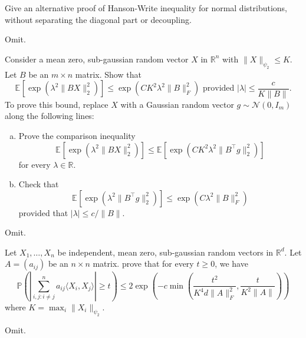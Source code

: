 \begin{problem*}[Exercise 6.2.5]\label{ex6.2.5}
	Give an alternative proof of Hanson-Write inequality for normal distributions, without separating the diagonal part or decoupling.
\end{problem*}
\begin{answer}
	Omit.
\end{answer}

\begin{problem*}[Exercise 6.2.6]\label{ex6.2.6}
	Consider a mean zero, sub-gaussian random vector \(X\) in \(\mathbb{R} ^n\) with \(\lVert X \rVert _{\psi _2} \leq K\). Let \(B\) be an \(m \times n\) matrix. Show that
	\[
		\mathbb{E}_{}\left[\exp (\lambda ^2 \lVert BX \rVert _2^2)\right]
		\leq \exp (CK^2 \lambda ^2 \lVert B \rVert _F^2)
		\text{ provided } \lvert \lambda \rvert \leq \frac{c}{K \lVert B \rVert }.
	\]
	To prove this bound, replace \(X\) with a Gaussian random vector \(g \sim \mathcal{N} (0, I_m)\) along the following lines:
	\begin{enumerate}[(a)]
		\item\label{ex6.2.6:a} Prove the comparison inequality
		      \[
			      \mathbb{E}_{}[\exp (\lambda ^2 \lVert BX \rVert _2^2)]
			      \leq \mathbb{E}_{}[\exp (CK^2 \lambda ^2 \lVert B^{\top} g \rVert _2^2)]
		      \]
		      for every \(\lambda \in \mathbb{R} \).
		\item\label{ex6.2.6:b} Check that
		      \[
			      \mathbb{E}_{}[\exp (\lambda ^2 \lVert B^{\top} g \rVert _2^2)]
			      \leq \exp (C \lambda ^2 \lVert B \rVert _F^2)
		      \]
		      provided that \(\lvert \lambda \rvert \leq c / \lVert B \rVert \).
	\end{enumerate}
\end{problem*}
\begin{answer}
	Omit.
\end{answer}

\begin{problem*}[Exercise 6.2.7]\label{ex6.2.7}
	Let \(X_1, \dots , X_n\) be independent, mean zero, sub-gaussian random vectors in \(\mathbb{R} ^d\). Let \(A = (a_{ij})\) be an \(n \times n\) matrix. prove that for every \(t \geq 0\), we have
	\[
		\mathbb{P} \left( \left\lvert \sum_{i, j\colon i \neq j}^{n} a_{ij} \langle X_i, X_j \rangle \right\rvert \geq t \right)
		\leq 2 \exp (- c \min \left( \frac{t^2}{K^4 d \lVert A \rVert _F^2} , \frac{t}{K^2 \lVert A \rVert }\right) )
	\]
	where \(K = \max _i \lVert X_i \rVert _{\psi _2}\).
\end{problem*}
\begin{answer}
	Omit.
\end{answer}

